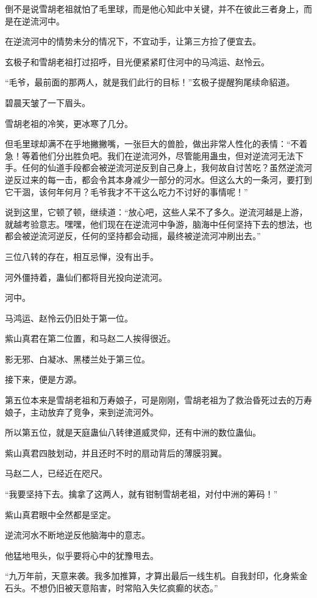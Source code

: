 \begin{this_body}
倒不是说雪胡老祖就怕了毛里球，而是他心知此中关键，并不在彼此三者身上，而是在逆流河中。

在逆流河中的情势未分的情况下，不宜动手，让第三方捡了便宜去。

玄极子和雪胡老祖打过招呼，目光便紧紧盯住河中的马鸿运、赵怜云。

“毛爷，最前面的那两人，就是我们此行的目标！”玄极子提醒狗尾续命貂道。

碧晨天皱了一下眉头。

雪胡老祖的冷笑，更冰寒了几分。

但毛里球却满不在乎地撇撇嘴，一张巨大的兽脸，做出非常人性化的表情：“不着急！等着他们分出胜负吧。我们在逆流河外，尽管能用蛊虫，但对逆流河无法下手。任何的仙道手段都会被逆流河逆反到自己身上，我何故自讨苦吃？虽然逆流河逆反过来的每一击，都会令其本身减少一部分的河水。但这么大的一条河，要打到它干涸，该何年何月？毛爷我才不干这么吃力不讨好的事情呢！”

说到这里，它顿了顿，继续道：“放心吧，这些人呆不了多久。逆流河越是上游，就越考验意志。嘿嘿，他们现在在逆流河中争游，脑海中任何坚持下去的想法，也都会被逆流河逆反，任何的坚持都会动摇，最终被逆流河冲刷出去。”

三位八转的存在，相互忌惮，没有出手。

河外僵持着，蛊仙们都将目光投向逆流河。

河中。

马鸿运、赵怜云仍旧处于第一位。

紫山真君在第二位置，和马赵二人挨得很近。

影无邪、白凝冰、黑楼兰处于第三位。

接下来，便是方源。

第五位本来是雪胡老祖和万寿娘子，可是刚刚，雪胡老祖为了救治昏死过去的万寿娘子，主动放弃了竞争，来到逆流河外。

所以第五位，就是天庭蛊仙八转律道威灵仰，还有中洲的数位蛊仙。

紫山真君四肢划动，并且还时不时的扇动背后的薄膜羽翼。

马赵二人，已经近在咫尺。

“我要坚持下去。擒拿了这两人，就有钳制雪胡老祖，对付中洲的筹码！”

紫山真君眼中全然都是坚定。

逆流河水不断地逆反他脑海中的意志。

他猛地甩头，似乎要将心中的犹豫甩去。

“九万年前，天意来袭。我多加推算，才算出最后一线生机。自我封印，化身紫金石头。不想仍旧被天意陷害，时常陷入失忆疯癫的状态。”


\end{this_body}
